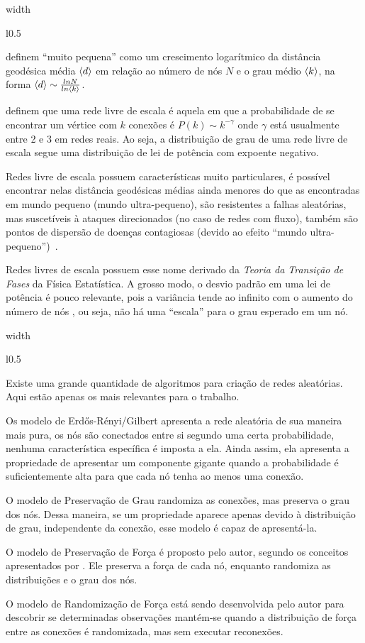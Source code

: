 \documentclass[10pt,a4paper,final]{article}
\newcommand\disappearingrule{%
  \par %
  \vskip10pt %
  \leaders\vrule width \textwidth\vskip0.4pt %
  \nointerlineskip %
  \vskip10pt %
}
\newenvironment{slidelong}[1]
{
  \disappearingrule
  
  \begin{minipage}[t]{\linewidth}
    \setlength{\parskip}{1ex}
    \begin{wrapfigure}{l}{0.5\textwidth}
      \includeslide[width=0.48\textwidth]{#1}%
      \vspace{-0.8cm}
      \label{sde:#1}
    \end{wrapfigure}}
    {\end{minipage}}
\begin{document}
\begin{slidelong}{propriedades}
   definem \enquote{muito pequena} como um crescimento logarítmico da distância geodésica média $\left\langle d \right\rangle$ em relação ao número de nós $N$ e o grau médio $\left\langle k \right\rangle$, na forma $\left\langle d \right\rangle \sim \frac{ln N}{ln \left\langle k \right\rangle}$.
  
   definem que uma rede livre de escala é aquela em que a probabilidade de se encontrar um vértice com $k$ conexões é $P(k) \sim k^{-\gamma}$ onde $\gamma$ está usualmente entre 2 e 3 em redes reais. Ao seja, a distribuição de grau de uma rede livre de escala segue uma distribuição de lei de potência com expoente negativo.
  
  Redes livre de escala possuem características muito particulares, é possível encontrar nelas distância geodésicas médias ainda menores do que as encontradas em mundo pequeno (mundo ultra-pequeno), são resistentes a falhas aleatórias, mas suscetíveis à ataques direcionados (no caso de redes com fluxo), também são pontos de dispersão de doenças contagiosas (devido ao efeito \enquote{mundo ultra-pequeno})~\cite{Barabasi2016-rn}. 
  
  Redes livres de escala possuem esse nome derivado da \textit{Teoria da Transição de Fases} da Física Estatística. A grosso modo, o desvio padrão em uma lei de potência é pouco relevante, pois a variância tende ao infinito com o aumento do número de nós \cite[pág. 122]{Barabasi2016-rn}, ou seja, não há uma \enquote{escala} para o grau esperado em um nó.
\end{slidelong}

\begin{slidelong}{modelos-nulos}
  Existe uma grande quantidade de algoritmos para criação de redes aleatórias. Aqui estão apenas os mais relevantes para o trabalho.
  
  Os modelo de Erdős-Rényi/Gilbert apresenta a rede aleatória de sua maneira mais pura, os nós são conectados entre si segundo uma certa probabilidade, nenhuma característica específica é imposta a ela. Ainda assim, ela apresenta a propriedade de apresentar um componente gigante quando a probabilidade é suficientemente alta para que cada nó tenha ao menos uma conexão.
  
  O modelo de Preservação de Grau randomiza as conexões, mas preserva o grau dos nós. Dessa maneira, se um propriedade aparece apenas devido à distribuição de grau, independente da conexão, esse modelo é capaz de apresentá-la.
  
  O modelo de Preservação de Força é proposto pelo autor, segundo os conceitos apresentados por . Ele preserva a força de cada nó, enquanto randomiza as distribuições e o grau dos nós.
  
  O modelo de Randomização de Força está sendo desenvolvida pelo autor para descobrir se determinadas observações mantém-se quando a distribuição de força entre as conexões é randomizada, mas sem executar reconexões.
\end{slidelong}
\end{document}
